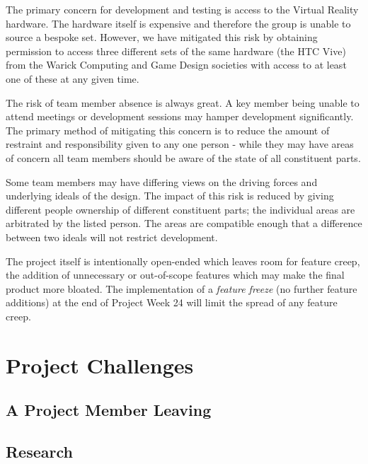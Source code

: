     \begin{description}[style=nextline]
            \item[\textbf{VR headset access}]
                The primary concern for development and testing is access to the Virtual Reality hardware. The hardware itself is expensive and therefore the group is unable to source a bespoke set. However, we have mitigated this risk by obtaining permission to access three different sets of the same hardware (the HTC Vive) from the Warick Computing and Game Design societies with access to at least one of these at any given time.
            \item[\textbf{Illness and absence}]
                The risk of team member absence is always great. A key member being unable to attend meetings or development sessions may hamper development significantly. The primary method of mitigating this concern is to reduce the amount of restraint and responsibility given to any one person - while they may have areas of concern all team members should be aware of the state of all constituent parts.
            \item[\textbf{Conflict of Interest}]
                Some team members may have differing views on the driving forces and underlying ideals of the design. The impact of this risk is reduced by giving different people ownership of different constituent parts; the individual areas are arbitrated by the listed person. The areas are compatible enough that a difference between two ideals will not restrict development.
            \item[\textbf{Feature creep}]
                The project itself is intentionally open-ended which leaves room for feature creep, the addition of unnecessary or out-of-scope features which may make the final product more bloated. The implementation of a \emph{feature freeze} (no further feature additions) at the end of Project Week 24 will limit the spread of any feature creep.
        \end{description}

\section{Project Challenges}

    \subsection{A Project Member Leaving}
    
    \subsection{Research}
    

